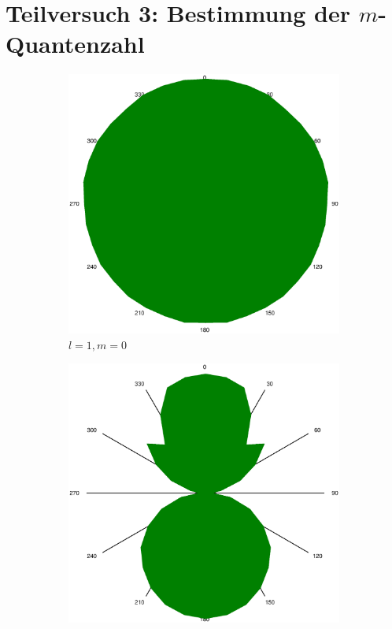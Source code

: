 \newpage
\section{Teilversuch 3: Bestimmung der $m$-Quantenzahl}

	\begin{figure}[!ht]
		\centering
		\begin{subfigure}{0.3\textwidth}
			\centering
			\includegraphics[width=\textwidth]{images/tv3-peak1-angle2.eps}
			\caption{$l = 1, m=0$}
			\label{fig:tv3-1}
		\end{subfigure}
		\begin{subfigure}{0.3\textwidth}
			\centering
			\includegraphics[width=\textwidth]{images/tv3-peak2-angle.eps}

\end{subfigure}
\end{figure}
